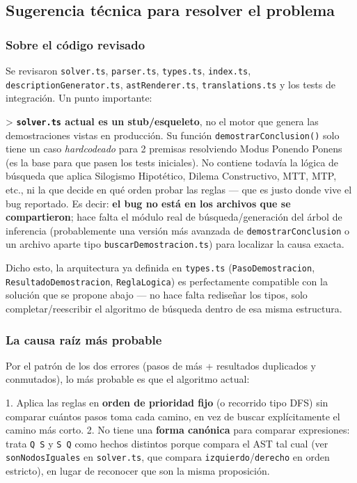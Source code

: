 \documentclass[11pt,a4paper,openany]{book}
\begin{document}
\hrulefill

\subsection{Sugerencia técnica para resolver el problema}

\subsubsection{Sobre el código revisado}

Se revisaron \texttt{solver.ts}, \texttt{parser.ts}, \texttt{types.ts}, \texttt{index.ts}, \texttt{descriptionGenerator.ts}, \texttt{astRenderer.ts}, \texttt{translations.ts} y los tests de integración. Un punto importante:

> \textbf{\texttt{solver.ts} actual es un stub/esqueleto}, no el motor que genera las demostraciones vistas en producción. Su función \texttt{demostrarConclusion()} solo tiene un caso \textit{hardcodeado} para 2 premisas resolviendo Modus Ponendo Ponens (es la base para que pasen los tests iniciales). No contiene todavía la lógica de búsqueda que aplica Silogismo Hipotético, Dilema Constructivo, MTT, MTP, etc., ni la que decide en qué orden probar las reglas --- que es justo donde vive el bug reportado. Es decir: \textbf{el bug no está en los archivos que se compartieron}; hace falta el módulo real de búsqueda/generación del árbol de inferencia (probablemente una versión más avanzada de \texttt{demostrarConclusion} o un archivo aparte tipo \texttt{buscarDemostracion.ts}) para localizar la causa exacta.

Dicho esto, la arquitectura ya definida en \texttt{types.ts} (\texttt{PasoDemostracion}, \texttt{ResultadoDemostracion}, \texttt{ReglaLogica}) es perfectamente compatible con la solución que se propone abajo --- no hace falta rediseñar los tipos, solo completar/reescribir el algoritmo de búsqueda dentro de esa misma estructura.

\subsubsection{La causa raíz más probable}

Por el patrón de los dos errores (pasos de más + resultados duplicados y conmutados), lo más probable es que el algoritmo actual:

1. Aplica las reglas en \textbf{orden de prioridad fijo} (o recorrido tipo DFS) sin comparar cuántos pasos toma cada camino, en vez de buscar explícitamente el camino más corto.
2. No tiene una \textbf{forma canónica} para comparar expresiones: trata \texttt{Q  S} y \texttt{S  Q} como hechos distintos porque compara el AST tal cual (ver \texttt{sonNodosIguales} en \texttt{solver.ts}, que compara \texttt{izquierdo}/\texttt{derecho} en orden estricto), en lugar de reconocer que son la misma proposición.
\end{document}

